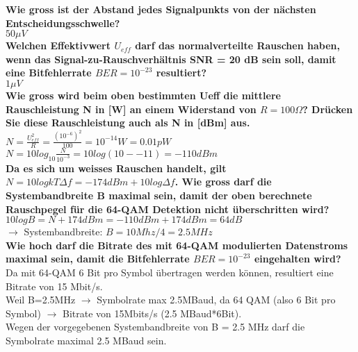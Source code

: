 \textbf{Wie gross ist der Abstand jedes Signalpunkts von der nächsten Entscheidungsschwelle?}\\
$50\mu V$\\

\textbf{Welchen Effektivwert $U_{eff}$ darf das normalverteilte Rauschen haben, wenn das Signal-zu-Rauschverhältnis \textbf{SNR = 20 dB} sein soll, damit eine Bitfehlerrate \textit{$BER = 10^{-23}$} resultiert?}\\
$1\mu V$\\

\textbf{Wie gross wird beim oben bestimmten Ueff die mittlere Rauschleistung N in [W] an einem Widerstand von $R = 100 \Omega$? Drücken Sie diese Rauschleistung auch als N in [dBm] aus.}\\
$N=\frac{U_{eff}^2}{R}=\frac{(10^{-6})^2}{100}=10^{-14}W=0.01pW$\\
$N=10log_{10}\frac{N}{10^{-3}}=10log(10-{-11})=-110dBm$\\

\textbf{Da es sich um weisses Rauschen handelt, gilt $N=10logkT\Delta f=-174dBm+10log\Delta f$.
Wie gross darf die Systembandbreite B maximal sein, damit der oben berechnete Rauschpegel für die 64-QAM Detektion nicht überschritten wird?}\\
$10logB=N+174dBm=-110dBm+174dBm=64dB$\\
$\rightarrow$ Systembandbreite: $B=10Mhz/4=2.5MHz$\\

\textbf{Wie hoch darf die Bitrate des mit 64-QAM modulierten Datenstroms maximal sein, damit die Bitfehlerrate \textbf{$BER = 10^{-23}$} eingehalten wird?}\\
Da mit 64-QAM 6 Bit pro Symbol übertragen werden können, resultiert eine Bitrate von 15 Mbit/s.\\
Weil B=2.5MHz $\rightarrow$ Symbolrate max 2.5MBaud, da 64 QAM (also 6 Bit pro Symbol) $\rightarrow$ Bitrate von 15Mbits/s (2.5 MBaud*6Bit).\\
Wegen der vorgegebenen Systembandbreite von B = 2.5 MHz darf die Symbolrate maximal 2.5 MBaud sein.

